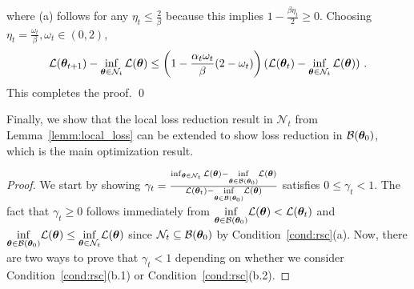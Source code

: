 where (a) follows for any $\eta_t\leq \frac{2}{\beta}$ because this implies $1-\frac{\beta\eta_t}{2}\geq 0$. Choosing $\eta_t = \frac{\omega_t}{\beta}, \omega_t \in (0,2)$,
$$
    {\mathcal{L}}({\bm{\theta}}_{t+1}) - \inf_{{\bm{\theta}} \in \mathcal{N}_t} {\mathcal{L}}({\bm{\theta}})  \leq \left(1-\frac{\alpha_t \omega_t}{\beta}(2-\omega_t)\right) ({\mathcal{L}}({\bm{\theta}}_t) - \inf_{{\bm{\theta}} \in \mathcal{N}_t} {\mathcal{L}}({\bm{\theta}}))~.
$$
This completes the proof. \qed

Finally, we show that the local loss reduction result in $\mathcal{N}_t$ from Lemma~\ref{lemm:local_loss} can be extended to show loss reduction in $\mathcal{B}({\bm{\theta}}_0)$, which is the main optimization result. 
%
\GlobalLossSmooth*
\begin{proof} We start by showing $\gamma_t = \frac{\inf_{{\bm{\theta}} \in \mathcal{N}_t} {\mathcal{L}}({\bm{\theta}}) - \underset{{\bm{\theta}} \in {\cal B}({\bm{\theta}}_0)}{\inf} {\mathcal{L}}({\bm{\theta}})}{{\mathcal{L}}({\bm{\theta}}_t) - \underset{{\bm{\theta}} \in {\cal B}({\bm{\theta}}_0)}{\inf} {\mathcal{L}}({\bm{\theta}})}$ satisfies $0 \leq \gamma_t < 1$. 
The fact that $\gamma_t \geq 0$ follows immediately from $\underset{{\bm{\theta}} \in {\cal B}({\bm{\theta}}_0)}{\inf} {\mathcal{L}}({\bm{\theta}})< {\mathcal{L}}({\bm{\theta}}_{t})$ and $\underset{{\bm{\theta}} \in {\cal B}({\bm{\theta}}_0)}{\inf} {\mathcal{L}}({\bm{\theta}})\leq \underset{{\bm{\theta}} \in \mathcal{N}_t}{\inf} {\mathcal{L}}({\bm{\theta}})$ since $\mathcal{N}_t\subseteq{\cal B}({\bm{\theta}}_0)$ by Condition~\ref{cond:rsc}(a).
%
%
%
Now, there are two ways to prove that $\gamma_t<1$ depending on whether we consider 
Condition~\ref{cond:rsc}(b.1) or Condition~\ref{cond:rsc}(b.2).


\end{proof}
